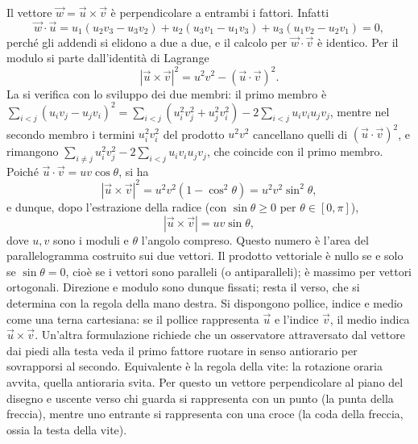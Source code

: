 \documentclass[11pt,a4paper]{article}
\begin{document}
Il vettore $\vec w=\vec u\times\vec v$ è perpendicolare a entrambi i fattori. Infatti
\[
\vec w\cdot\vec u=u_1(u_2v_3-u_3v_2)+u_2(u_3v_1-u_1v_3)+u_3(u_1v_2-u_2v_1)=0 ,
\]
perché gli addendi si elidono a due a due, e il calcolo per $\vec w\cdot\vec v$ è identico. Per il modulo si parte dall'identità di Lagrange
\[
|\vec u\times\vec v|^2=u^2v^2-(\vec u\cdot\vec v)^2 .
\]
La si verifica con lo sviluppo dei due membri: il primo membro è $\sum_{i<j}(u_iv_j-u_jv_i)^2=\sum_{i<j}(u_i^2v_j^2+u_j^2v_i^2)-2\sum_{i<j}u_iv_iu_jv_j$, mentre nel secondo membro i termini $u_i^2v_i^2$ del prodotto $u^2v^2$ cancellano quelli di $(\vec u\cdot\vec v)^2$, e rimangono $\sum_{i\neq j}u_i^2v_j^2-2\sum_{i<j}u_iv_iu_jv_j$, che coincide con il primo membro. Poiché $\vec u\cdot\vec v=uv\cos\theta$, si ha
\[
|\vec u\times\vec v|^2=u^2v^2(1-\cos^2\theta)=u^2v^2\sin^2\theta ,
\]
e dunque, dopo l'estrazione della radice (con $\sin\theta\ge0$ per $\theta\in[0,\pi]$),
\[
|\vec u\times\vec v|=uv\sin\theta ,
\]
dove $u,v$ sono i moduli e $\theta$ l'angolo compreso. Questo numero è l'area del parallelogramma costruito sui due vettori. Il prodotto vettoriale è nullo se e solo se $\sin\theta=0$, cioè se i vettori sono paralleli (o antiparalleli); è massimo per vettori ortogonali. Direzione e modulo sono dunque fissati; resta il verso, che si determina con la regola della mano destra. Si dispongono pollice, indice e medio come una terna cartesiana: se il pollice rappresenta $\vec u$ e l'indice $\vec v$, il medio indica $\vec u\times\vec v$. Un'altra formulazione richiede che un osservatore attraversato dal vettore dai piedi alla testa veda il primo fattore ruotare in senso antiorario per sovrapporsi al secondo. Equivalente è la regola della vite: la rotazione oraria avvita, quella antioraria svita. Per questo un vettore perpendicolare al piano del disegno e uscente verso chi guarda si rappresenta con un punto (la punta della freccia), mentre uno entrante si rappresenta con una croce (la coda della freccia, ossia la testa della vite).
\end{document}
